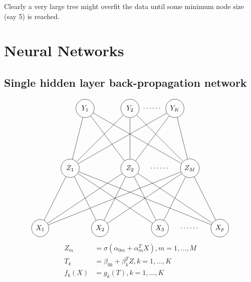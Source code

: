 \documentclass{report}
\theoremstyle{nonumberplain}
\newcommand{\0}{\mathbf{0}}
\begin{document}
Clearly a very large tree might overfit
the data until some minimum node size (say 5) is reached.

\chapter{Neural Networks}
\section{Single hidden layer back-propagation network}
\[
\begin{tikzpicture}[scale=1.5]
\draw (0,0) node [draw,shape=circle] (x1) {$X_1$};
\draw (2,0) node [draw,shape=circle] (x2) {$X_2$};
\draw (4,0) node [draw,shape=circle] (x3) {$X_3$};
\draw (5,0) node (xdots) {$\cdots\cdots$};
\draw (6,0) node [draw,shape=circle] (xp) {$X_p$};
\draw (1,2) node [draw,shape=circle,minimum height=0.92cm] (z1) {$Z_1$};
\draw (3,2) node [draw,shape=circle,minimum height=0.92cm] (z2) {$Z_2$};
\draw (4,2) node (zdots) {$\cdots\cdots$};
\draw (5,2) node [draw,shape=circle,minimum height=0.92cm] (zm) {$Z_M$};
\draw (1.5,4) node [draw,shape=circle,minimum height=0.92cm] (y1) {$Y_1$};
\draw (3,4) node [draw,shape=circle,minimum height=0.92cm] (y2) {$Y_2$};
\draw (3.75,4) node (ydots) {$\cdots\cdots$};
\draw (4.5,4) node [draw,shape=circle,minimum height=0.92cm] (yk) {$Y_K$};
\draw 
(x1) -- node[pos=0.1,above]{} node[pos=0.85,above]{} (z1)
(x1) -- node[pos=0.1,below]{} node[pos=0.85,below]{}(z2)
(x1) -- node[pos=0.1,above]{} node[pos=0.85,above]{} (zm)
(x2) -- node[pos=0.05,anchor=90]{} node[pos=0.85,below]{} (z1)
(x2) -- node[pos=0.1,below]{} node[pos=0.85,below]{} (z2)
(x2) -- node[pos=0.1,above]{} node[pos=0.85,above]{} (zm)
(x3) -- node[pos=0.1,above]{} node[pos=0.85,above]{} (z1)
(x3) -- node[pos=0.1,above]{} node[pos=0.85,above]{} (z2)
(x3) -- node[pos=0.1,above]{} node[pos=0.85,above]{} (zm)
(xp) -- node[pos=0.1,above]{} node[pos=0.85,above]{} (z1)
(xp) -- node[pos=0.1,above]{} node[pos=0.85,above]{} (z2)
(xp) -- node[pos=0.1,above]{} node[pos=0.85,above]{} (zm)
(z1) -- node[pos=0.1,above]{} node[pos=0.85,above]{} (y1)
(z1) -- node[pos=0.1,above]{} node[pos=0.85,above]{} (y2)
(z1) -- node[pos=0.1,above]{} node[pos=0.85,above]{} (yk)
(z2) -- node[pos=0.1,above]{} node[pos=0.85,above]{} (y1)
(z2) -- node[pos=0.1,above]{} node[pos=0.85,above]{} (y2)
(z2) -- node[pos=0.1,above]{} node[pos=0.85,above]{} (yk)
(zm) -- node[pos=0.1,above]{} node[pos=0.85,above]{} (y1)
(zm) -- node[pos=0.1,above]{} node[pos=0.85,above]{} (y2)
(zm) -- node[pos=0.1,above]{} node[pos=0.85,above]{} (yk)
;
\end{tikzpicture}
\]
\[
\begin{aligned} Z_{m} &=\sigma\left(\alpha_{0 m}+\alpha_{m}^{T} X\right), m=1, \ldots, M \\ T_{k} &=\beta_{0 k}+\beta_{k}^{T} Z, k=1, \ldots, K \\ f_{k}(X) &=g_{k}(T), k=1, \ldots, K 
\end{aligned}
\]
\end{document}
